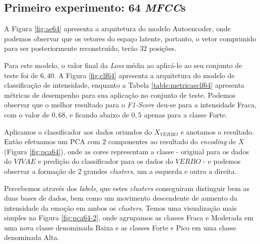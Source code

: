 \subsection{Primeiro experimento: 64 \textit{MFCC}s}

A Figura \ref{fig:ae64} apresenta a arquitetura do modelo Autoencoder, onde podemos observar que os vetores do espaço latente, portanto, o vetor comprimido para ser posteriormente reconstruído, terão $32$ posições.

Para este modelo, o valor final da \textit{Loss} média ao aplicá-lo ao seu conjunto de teste foi de $6,40$. 
A Figura \ref{fig:clf64} apresenta a arquitetura do modelo de classificação de intensidade, enquanto a Tabela \ref{table:metricasclf64} apresenta métricas de desempenho para sua aplicação no conjunto de teste. Podemos observar que o melhor resultado para o \textit{F1-Score} deu-se para a intensidade Fraca, com o valor de $0,68$, e ficando abaixo de $0,5$ apenas para a classe Forte.

Aplicamos o classificador aos dados oriundos do $X_{VERBO}$ e anotamos o resultado. Então efetuamos um \acrshort{PCA} com 2 componentes ao resultado do \textit{encoding} de $X$ (Figura \ref{fig:pca64}), onde as cores representam a classe - original para os dados do $VIVAE$ e predição do classificador para os dados do $VERBO$ - e podemos observar a formação de 2 grandes \textit{clusters}, um a esquerda e outro a direita.

Percebemos através dos \textit{labels}, que estes \textit{clusters} conseguiram distinguir bem as duas bases de dados, bem como um movimento descendente de aumento da intensidade da emoção em ambos os \textit{clusters}. Temos uma visualização mais simples na Figura \ref{fig:pca64-2}, onde agrupamos as classes Fraca e Moderada em uma nova classe denominada Baixa e as classes Forte e Pico em uma classe denominada Alta.


